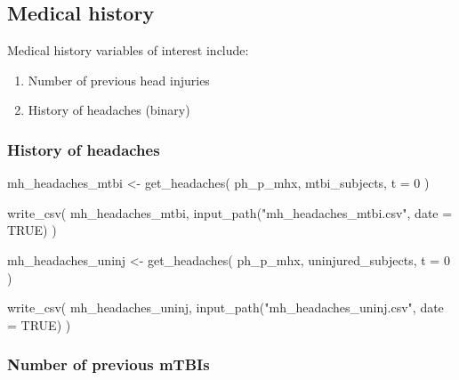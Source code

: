 \documentclass[
  letterpaper,
  DIV=11,
  numbers=noendperiod]{scrreprt}
\newenvironment{Shaded}{\begin{snugshade}}{\end{snugshade}}
\newcommand{\AttributeTok}[1]{\textcolor[rgb]{0.40,0.45,0.13}{#1}}
\newcommand{\ConstantTok}[1]{\textcolor[rgb]{0.56,0.35,0.01}{#1}}
\newcommand{\DecValTok}[1]{\textcolor[rgb]{0.68,0.00,0.00}{#1}}
\newcommand{\FunctionTok}[1]{\textcolor[rgb]{0.28,0.35,0.67}{#1}}
\newcommand{\NormalTok}[1]{\textcolor[rgb]{0.00,0.23,0.31}{#1}}
\newcommand{\OtherTok}[1]{\textcolor[rgb]{0.00,0.23,0.31}{#1}}
\newcommand{\StringTok}[1]{\textcolor[rgb]{0.13,0.47,0.30}{#1}}
\providecommand{\tightlist}{%
  \setlength{\itemsep}{0pt}\setlength{\parskip}{0pt}}\usepackage{longtable,booktabs,array}
\begin{document}
\subsection{Medical history}\label{medical-history}

Medical history variables of interest include:

\begin{enumerate}
\def\labelenumi{\arabic{enumi}.}
\tightlist
\item
  Number of previous head injuries
\item
  History of headaches (binary)
\end{enumerate}

\subsubsection{History of headaches}\label{history-of-headaches}

\begin{Shaded}
\begin{Highlighting}[]
\NormalTok{mh\_headaches\_mtbi }\OtherTok{\textless{}{-}} \FunctionTok{get\_headaches}\NormalTok{(}
\NormalTok{    ph\_p\_mhx,}
\NormalTok{    mtbi\_subjects,}
    \AttributeTok{t =} \DecValTok{0}
\NormalTok{)}

\FunctionTok{write\_csv}\NormalTok{(}
\NormalTok{    mh\_headaches\_mtbi, }\FunctionTok{input\_path}\NormalTok{(}\StringTok{"mh\_headaches\_mtbi.csv"}\NormalTok{, }\AttributeTok{date =} \ConstantTok{TRUE}\NormalTok{)}
\NormalTok{)}

\NormalTok{mh\_headaches\_uninj }\OtherTok{\textless{}{-}} \FunctionTok{get\_headaches}\NormalTok{(}
\NormalTok{    ph\_p\_mhx,}
\NormalTok{    uninjured\_subjects,}
    \AttributeTok{t =} \DecValTok{0}
\NormalTok{)}

\FunctionTok{write\_csv}\NormalTok{(}
\NormalTok{    mh\_headaches\_uninj, }\FunctionTok{input\_path}\NormalTok{(}\StringTok{"mh\_headaches\_uninj.csv"}\NormalTok{, }\AttributeTok{date =} \ConstantTok{TRUE}\NormalTok{)}
\NormalTok{)}
\end{Highlighting}
\end{Shaded}

\subsubsection{Number of previous mTBIs}\label{number-of-previous-mtbis}
\end{document}
